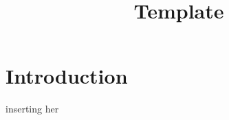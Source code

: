 \documentclass[12pt, oneside]{article}
\begin{document}
\title{Template} %


\setcounter{page}{1}
\section{Introduction}


inserting her

{}

\end{document}

